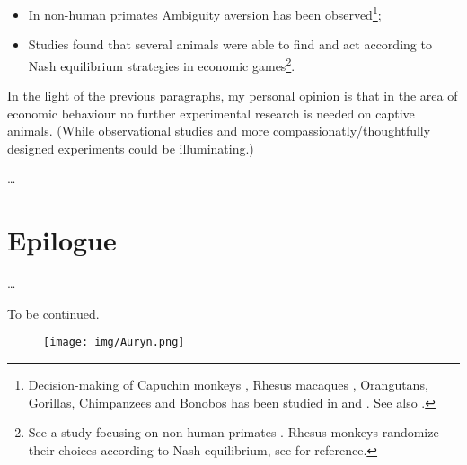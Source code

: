\documentclass{article}
\begin{document}
\begin{itemize}
    \item In non-human primates Ambiguity aversion has been observed\footnote{Decision-making of Capuchin monkeys \cite{thesis:AmbiguityAversionInCapuchinMonkeys}, Rhesus macaques \cite{paper:RhesusMacaquesAmbiguity}, Orangutans, Gorillas, Chimpanzees and Bonobos has been studied in \cite{paper:PrimatesAmbiguity} and \cite{paper:PrimateRandomArticle}. See also \cite{paper:ChimpanzeesBonobosAmbiguity}.};
    \item Studies found that several animals were able to find and act according to Nash equilibrium strategies in economic games\footnote{See a study focusing on non-human primates \cite{paper:EconomicGamesPrimates}. Rhesus monkeys randomize their choices according to Nash equilibrium, see \cite{paper:PrimateRandomArticle} for reference.}.
\end{itemize}

In the light of the previous paragraphs, my personal opinion is that in the area of economic behaviour no further experimental research is needed on captive animals. (While observational studies and more compassionatly/thoughtfully designed experiments could be illuminating.)

\dots


\section*{Epilogue}

\dots


{\centering
\vspace{1 cm}
  \Huge To be continued.\par


\begin{figure}[h]
    \centering
    \texttt{[image: img/Auryn.png]}
\end{figure}

}





\newpage
\printbibliography
\end{document}
